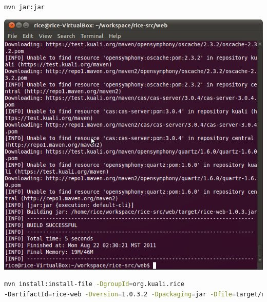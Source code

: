 \begin{lstlisting}[language=bash,basicstyle=\scriptsize,backgroundcolor=\color{ubergray},caption={Maven
  commans},frame=single,breaklines=true
]
mvn jar:jar
\end{lstlisting}
\includegraphics[width=\textwidth]{images/Screenshot7.png}

\begin{lstlisting}[language=bash,basicstyle=\scriptsize,backgroundcolor=\color{ubergray},caption={Maven
  commands},frame=single,breaklines=true
]
mvn install:install-file -DgroupId=org.kuali.rice
-DartifactId=rice-web -Dversion=1.0.3.2 -Dpackaging=jar -Dfile=target/rice-web-1.0.3.2.jar
\end{lstlisting}

